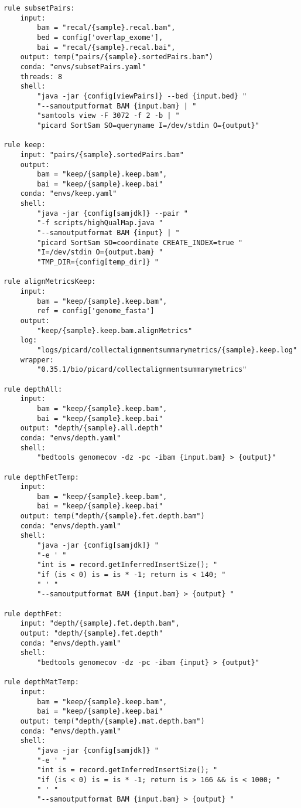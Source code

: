 \documentclass{article}\usepackage[]{graphicx}\usepackage[]{color}
\makeatletter
\newenvironment{kframe}{%
 \def\at@end@of@kframe{}%
 \ifinner\ifhmode%
  \def\at@end@of@kframe{\end{minipage}}%
  \begin{minipage}{\columnwidth}%
 \fi\fi%
 \def\FrameCommand##1{\hskip\@totalleftmargin \hskip-\fboxsep
 \colorbox{shadecolor}{##1}\hskip-\fboxsep
     \hskip-\linewidth \hskip-\@totalleftmargin \hskip\columnwidth}%
 \MakeFramed {\advance\hsize-\width
   \@totalleftmargin\z@ \linewidth\hsize
   \@setminipage}}%
 {\par\unskip\endMakeFramed%
 \at@end@of@kframe}
\newenvironment{knitrout}{}{} %
\makeatother
\begin{document}
\begin{knitrout}
\begin{kframe}
\begin{verbatim}
rule subsetPairs:
    input: 
        bam = "recal/{sample}.recal.bam",
        bed = config['overlap_exome'],
        bai = "recal/{sample}.recal.bai",
    output: temp("pairs/{sample}.sortedPairs.bam")
    conda: "envs/subsetPairs.yaml"
    threads: 8
    shell:
        "java -jar {config[viewPairs]} --bed {input.bed} "
        "--samoutputformat BAM {input.bam} | "
        "samtools view -F 3072 -f 2 -b | "
        "picard SortSam SO=queryname I=/dev/stdin O={output}"

rule keep:
    input: "pairs/{sample}.sortedPairs.bam"
    output: 
        bam = "keep/{sample}.keep.bam",
        bai = "keep/{sample}.keep.bai"
    conda: "envs/keep.yaml"
    shell:
        "java -jar {config[samjdk]} --pair "
        "-f scripts/highQualMap.java "
        "--samoutputformat BAM {input} | "
        "picard SortSam SO=coordinate CREATE_INDEX=true "
        "I=/dev/stdin O={output.bam} "
        "TMP_DIR={config[temp_dir]} "

rule alignMetricsKeep:
    input:
        bam = "keep/{sample}.keep.bam",
        ref = config['genome_fasta']
    output:
        "keep/{sample}.keep.bam.alignMetrics"
    log:
        "logs/picard/collectalignmentsummarymetrics/{sample}.keep.log"
    wrapper:
        "0.35.1/bio/picard/collectalignmentsummarymetrics"

rule depthAll:
    input:
        bam = "keep/{sample}.keep.bam",
        bai = "keep/{sample}.keep.bai"
    output: "depth/{sample}.all.depth"
    conda: "envs/depth.yaml"
    shell:
        "bedtools genomecov -dz -pc -ibam {input.bam} > {output}"

rule depthFetTemp:
    input:
        bam = "keep/{sample}.keep.bam",
        bai = "keep/{sample}.keep.bai"
    output: temp("depth/{sample}.fet.depth.bam")
    conda: "envs/depth.yaml"
    shell:
        "java -jar {config[samjdk]} "
        "-e ' "
        "int is = record.getInferredInsertSize(); "
        "if (is < 0) is = is * -1; return is < 140; "
        " ' "
        "--samoutputformat BAM {input.bam} > {output} "

rule depthFet:
    input: "depth/{sample}.fet.depth.bam",
    output: "depth/{sample}.fet.depth"
    conda: "envs/depth.yaml"
    shell:
        "bedtools genomecov -dz -pc -ibam {input} > {output}"

rule depthMatTemp:
    input:
        bam = "keep/{sample}.keep.bam",
        bai = "keep/{sample}.keep.bai"
    output: temp("depth/{sample}.mat.depth.bam")
    conda: "envs/depth.yaml"
    shell:
        "java -jar {config[samjdk]} "
        "-e ' "
        "int is = record.getInferredInsertSize(); "
        "if (is < 0) is = is * -1; return is > 166 && is < 1000; "
        " ' "
        "--samoutputformat BAM {input.bam} > {output} "


\end{verbatim}
\end{kframe}
\end{knitrout}
\end{document}
